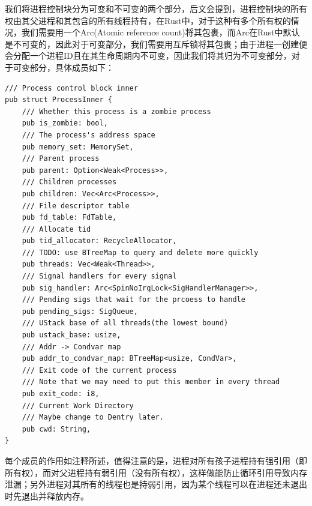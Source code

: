 我们将进程控制块分为可变和不可变的两个部分，后文会提到，进程控制块的所有权由其父进程和其包含的所有线程持有，在Rust中，对于这种有多个所有权的情况，我们需要用一个Arc(Atomic reference count)将其包裹，而Arc在Rust中默认是不可变的，因此对于可变部分，我们需要用互斥锁将其包裹；由于进程一创建便会分配一个进程ID且在其生命周期内不可变，因此我们将其归为不可变部分，对于可变部分，具体成员如下：
\begin{tcolorbox}[
title=\textbf{os/src/process/mod.rs},
listing only,
breakable
]
\begin{verbatim}
/// Process control block inner
pub struct ProcessInner {
    /// Whether this process is a zombie process
    pub is_zombie: bool,
    /// The process's address space
    pub memory_set: MemorySet,
    /// Parent process
    pub parent: Option<Weak<Process>>,
    /// Children processes
    pub children: Vec<Arc<Process>>,
    /// File descriptor table
    pub fd_table: FdTable,
    /// Allocate tid
    pub tid_allocator: RecycleAllocator,
    /// TODO: use BTreeMap to query and delete more quickly
    pub threads: Vec<Weak<Thread>>,
    /// Signal handlers for every signal
    pub sig_handler: Arc<SpinNoIrqLock<SigHandlerManager>>,
    /// Pending sigs that wait for the prcoess to handle
    pub pending_sigs: SigQueue,
    /// UStack base of all threads(the lowest bound)
    pub ustack_base: usize,
    /// Addr -> Condvar map
    pub addr_to_condvar_map: BTreeMap<usize, CondVar>,
    /// Exit code of the current process
    /// Note that we may need to put this member in every thread
    pub exit_code: i8,
    /// Current Work Directory
    /// Maybe change to Dentry later.
    pub cwd: String,
}
\end{verbatim}
\end{tcolorbox}
每个成员的作用如注释所述，值得注意的是，进程对所有孩子进程持有强引用（即所有权），而对父进程持有弱引用（没有所有权），这样做能防止循环引用导致内存泄漏；另外进程对其所有的线程也是持弱引用，因为某个线程可以在进程还未退出时先退出并释放内存。

